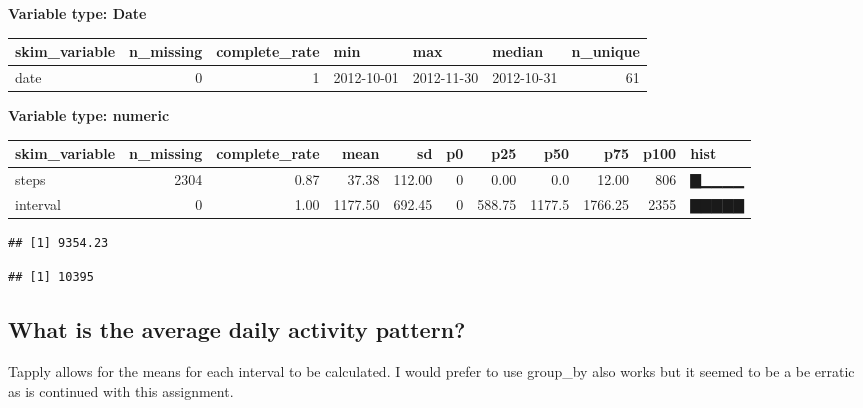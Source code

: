 \documentclass[
]{article}
\newenvironment{Shaded}{\begin{snugshade}}{\end{snugshade}}
\newcommand{\FunctionTok}[1]{\textcolor[rgb]{0.00,0.00,0.00}{#1}}
\newcommand{\NormalTok}[1]{#1}
\newcommand{\SpecialCharTok}[1]{\textcolor[rgb]{0.00,0.00,0.00}{#1}}
\begin{document}
\textbf{Variable type: Date}

\begin{longtable}[]{@{}lrrlllr@{}}
\toprule
skim\_variable & n\_missing & complete\_rate & min & max & median &
n\_unique \\
\midrule
\endhead
date & 0 & 1 & 2012-10-01 & 2012-11-30 & 2012-10-31 & 61 \\
\bottomrule
\end{longtable}

\textbf{Variable type: numeric}

\begin{longtable}[]{@{}lrrrrrrrrrl@{}}
\toprule
skim\_variable & n\_missing & complete\_rate & mean & sd & p0 & p25 &
p50 & p75 & p100 & hist \\
\midrule
\endhead
steps & 2304 & 0.87 & 37.38 & 112.00 & 0 & 0.00 & 0.0 & 12.00 & 806 &
▇▁▁▁▁ \\
interval & 0 & 1.00 & 1177.50 & 692.45 & 0 & 588.75 & 1177.5 & 1766.25 &
2355 & ▇▇▇▇▇ \\
\bottomrule
\end{longtable}

\begin{Shaded}
\end{Shaded}

\begin{verbatim}
## [1] 9354.23
\end{verbatim}

\begin{Shaded}
\end{Shaded}

\begin{verbatim}
## [1] 10395
\end{verbatim}

\hypertarget{what-is-the-average-daily-activity-pattern}{%
\subsection{What is the average daily activity
pattern?}\label{what-is-the-average-daily-activity-pattern}}

Tapply allows for the means for each interval to be calculated. I would
prefer to use group\_by also works but it seemed to be a be erratic as
is continued with this assignment.
\end{document}
